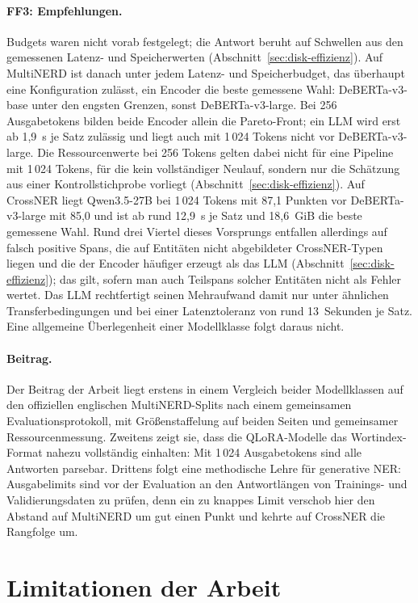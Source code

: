 \paragraph{FF3: Empfehlungen.}
Budgets waren nicht vorab festgelegt; die Antwort beruht auf Schwellen
aus den gemessenen Latenz- und Speicherwerten
(Abschnitt~\ref{sec:disk-effizienz}).
Auf MultiNERD ist danach unter jedem Latenz- und Speicherbudget, das
überhaupt eine Konfiguration zulässt, ein Encoder die beste gemessene
Wahl: DeBERTa-v3-base unter den engsten Grenzen, sonst DeBERTa-v3-large.
Bei 256 Ausgabetokens bilden beide Encoder allein die Pareto-Front; ein
LLM wird erst ab 1,9~s je Satz zulässig und liegt auch mit 1\,024 Tokens
nicht vor DeBERTa-v3-large.
Die Ressourcenwerte bei 256 Tokens gelten dabei nicht für eine Pipeline
mit 1\,024 Tokens, für die kein vollständiger Neulauf, sondern nur die
Schätzung aus einer Kontrollstichprobe vorliegt
(Abschnitt~\ref{sec:disk-effizienz}).
Auf CrossNER liegt Qwen3.5-27B bei 1\,024 Tokens mit 87,1 Punkten vor
DeBERTa-v3-large mit 85,0 und ist ab rund 12,9~s je Satz und 18,6~GiB
die beste gemessene Wahl.
Rund drei Viertel dieses Vorsprungs entfallen allerdings auf falsch
positive Spans, die auf Entitäten nicht abgebildeter CrossNER-Typen liegen
und die der Encoder häufiger erzeugt als das LLM
(Abschnitt~\ref{sec:disk-effizienz}); das gilt, sofern man auch
Teilspans solcher Entitäten nicht als Fehler wertet.
Das LLM rechtfertigt seinen Mehraufwand damit nur unter ähnlichen
Transferbedingungen und bei einer Latenztoleranz von rund 13~Sekunden
je Satz.
Eine allgemeine Überlegenheit einer Modellklasse folgt daraus nicht.

\paragraph{Beitrag.}
Der Beitrag der Arbeit liegt erstens in einem Vergleich beider
Modellklassen auf den offiziellen englischen MultiNERD-Splits nach einem
gemeinsamen Evaluationsprotokoll, mit Größenstaffelung auf beiden Seiten und
gemeinsamer Ressourcenmessung.
Zweitens zeigt sie, dass die QLoRA-Modelle das Wortindex-Format nahezu
vollständig einhalten: Mit 1\,024 Ausgabetokens sind alle
Antworten parsebar.
Drittens folgt eine methodische Lehre für generative NER: Ausgabelimits
sind vor der Evaluation an den Antwortlängen von Trainings- und
Validierungsdaten zu prüfen, denn ein zu knappes Limit verschob hier den
Abstand auf MultiNERD um gut einen Punkt und kehrte auf CrossNER die
Rangfolge um.

\section{Limitationen der Arbeit}
\label{sec:limitationen}

